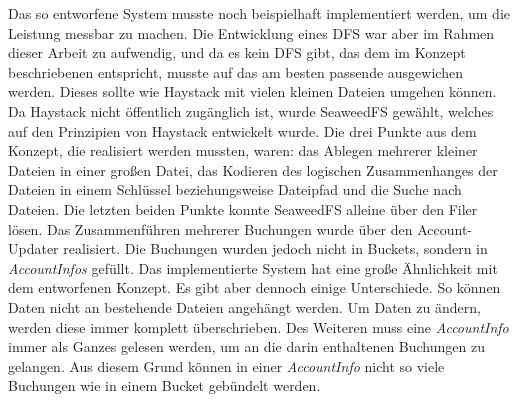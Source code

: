 \documentclass[12pt,oneside,a4paper,parskip]{scrbook}
\begin{document}
Das so entworfene System musste noch beispielhaft implementiert werden, um die Leistung messbar zu machen. Die Entwicklung eines DFS war aber im Rahmen dieser Arbeit zu aufwendig, und da es kein DFS gibt, das dem im Konzept beschriebenen entspricht, musste auf das am besten passende ausgewichen werden. Dieses sollte wie Haystack mit vielen kleinen Dateien umgehen können. Da Haystack nicht öffentlich zugänglich ist, wurde SeaweedFS gewählt, welches auf den Prinzipien von Haystack entwickelt wurde. Die drei Punkte aus dem Konzept, die realisiert werden mussten, waren: das Ablegen mehrerer kleiner Dateien in einer großen Datei, das Kodieren des logischen Zusammenhanges der Dateien in einem Schlüssel beziehungsweise Dateipfad und die Suche nach Dateien. Die letzten beiden Punkte konnte SeaweedFS alleine über den Filer lösen. Das Zusammenführen mehrerer Buchungen wurde über den Account-Updater realisiert. Die Buchungen wurden jedoch nicht in Buckets, sondern in \textit{AccountInfos} gefüllt. Das implementierte System hat eine große Ähnlichkeit mit dem entworfenen Konzept. Es gibt aber dennoch einige Unterschiede. So können Daten nicht an bestehende Dateien angehängt werden. Um Daten zu ändern, werden diese immer komplett überschrieben. Des Weiteren muss eine \textit{AccountInfo} immer als Ganzes gelesen werden, um an die darin enthaltenen Buchungen zu gelangen. Aus diesem Grund können in einer \textit{AccountInfo} nicht so viele Buchungen wie in einem Bucket gebündelt werden. 
\end{document}
